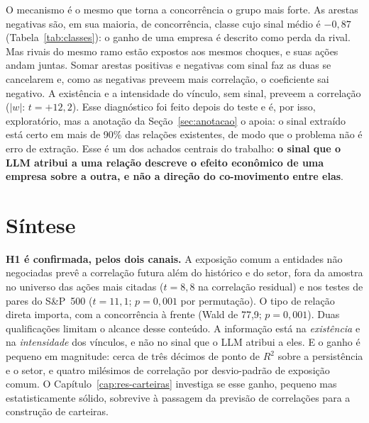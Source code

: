 O mecanismo é o mesmo que torna a concorrência o grupo mais forte. As arestas negativas são, em sua
maioria, de concorrência, classe cujo sinal médio é $-0{,}87$ (Tabela~\ref{tab:classes}): o ganho de uma
empresa é descrito como perda da rival. Mas rivais do mesmo ramo estão expostos aos mesmos choques, e suas
ações andam juntas. Somar arestas positivas e negativas com sinal faz as duas se cancelarem e, como as
negativas preveem mais correlação, o coeficiente sai negativo. A existência e a intensidade do vínculo,
sem sinal, preveem a correlação ($|w|$: $t=+12{,}2$). Esse diagnóstico foi feito depois do teste e é, por
isso, exploratório, mas a anotação da Seção~\ref{sec:anotacao} o apoia: o sinal extraído está certo em
mais de 90\% das relações existentes, de modo que o problema não é erro de extração. Esse é um dos
achados centrais do trabalho: \textbf{o sinal que o LLM atribui a uma relação descreve o efeito econômico
de uma empresa sobre a outra, e não a direção do co-movimento entre elas}.

\section{Síntese}
\label{sec:sintese-h1}

\textbf{H1 é confirmada, pelos dois canais.} A exposição comum a entidades não negociadas prevê a
correlação futura além do histórico e do setor, fora da amostra no universo das ações mais citadas
($t=8{,}8$ na correlação residual) e nos testes de pares do S\&P~500 ($t=11{,}1$; $p=0{,}001$ por permutação).
O tipo de relação direta importa, com a concorrência à frente (Wald de 77,9; $p=0{,}001$). Duas
qualificações limitam o alcance desse conteúdo. A informação está na \emph{existência} e na
\emph{intensidade} dos vínculos, e não no sinal que o LLM atribui a eles. E o ganho é pequeno em magnitude:
cerca de três décimos de ponto de $R^2$ sobre a persistência e o setor, e quatro milésimos de correlação por
desvio-padrão de exposição comum. O Capítulo~\ref{cap:res-carteiras} investiga se esse ganho, pequeno mas
estatisticamente sólido, sobrevive à passagem da previsão de correlações para a construção de carteiras.

\clearpage
